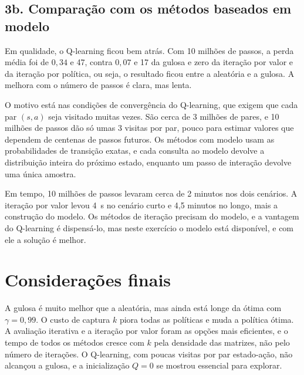\documentclass[11pt,a4paper]{article}
\begin{document}
\subsection*{3b. Comparação com os métodos baseados em modelo}

Em qualidade, o Q-learning ficou bem atrás. Com 10 milhões de passos, a perda média foi de $0{,}34$ e 47, contra $0{,}07$ e 17 da gulosa e zero da iteração por valor e da iteração por política, ou seja, o resultado ficou entre a aleatória e a gulosa. A melhora com o número de passos é clara, mas lenta.

O motivo está nas condições de convergência do Q-learning, que exigem que cada par $(s, a)$ seja visitado muitas vezes. São cerca de 3 milhões de pares, e 10 milhões de passos dão só umas 3 visitas por par, pouco para estimar valores que dependem de centenas de passos futuros. Os métodos com modelo usam as probabilidades de transição exatas, e cada consulta ao modelo devolve a distribuição inteira do próximo estado, enquanto um passo de interação devolve uma única amostra.

Em tempo, 10 milhões de passos levaram cerca de 2 minutos nos dois cenários. A iteração por valor levou 4~s no cenário curto e 4,5 minutos no longo, mais a construção do modelo. Os métodos de iteração precisam do modelo, e a vantagem do Q-learning é dispensá-lo, mas neste exercício o modelo está disponível, e com ele a solução é melhor.

\section{Considerações finais}

A gulosa é muito melhor que a aleatória, mas ainda está longe da ótima com $\gamma = 0{,}99$. O custo de captura $k$ piora todas as políticas e muda a política ótima. A avaliação iterativa e a iteração por valor foram as opções mais eficientes, e o tempo de todos os métodos cresce com $k$ pela densidade das matrizes, não pelo número de iterações. O Q-learning, com poucas visitas por par estado-ação, não alcançou a gulosa, e a inicialização $Q = 0$ se mostrou essencial para explorar.
\end{document}
